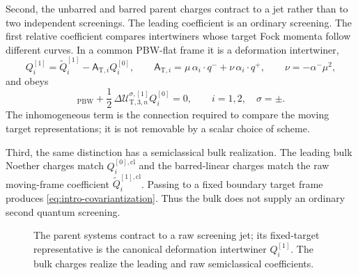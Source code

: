 \documentclass[11pt,a4paper]{article}
\numberwithin{equation}{section}
\theoremstyle{remark}
\newcommand{\PBW}{\mathrm{PBW}}
\newcommand{\cl}{\mathrm{cl}}
\newcommand{\T}{\mathrm{T}}
\newcommand{\cU}{\mathcal U}
\begin{document}
Second, the unbarred and barred parent charges contract to a jet rather than to two independent
screenings.  The leading coefficient is an ordinary screening.  The first relative coefficient
compares intertwiners whose target Fock momenta follow different curves.  In a common PBW-flat
frame it is a deformation intertwiner,
\begin{equation}
  Q_i^{[1]}=\widetilde Q_i^{[1]}-\mathsf A_{\T,i}Q_i^{[0]},
  \qquad
  \mathsf A_{\T,i}=\mu\,\alpha_i\!\cdot q^-+\nu\,\alpha_i\!\cdot q^+,
  \qquad \nu=-\alpha^-\mu^2,
  \label{eq:intro-covariantization}
\end{equation}
and obeys
\begin{equation}
 [Q_i^{[1]},\cU_{3,n}^{\sigma,[0]}]_{\PBW}
 +\frac12\,\Delta\cU_{\T,3,n}^{\sigma,[1]}Q_i^{[0]}=0,
 \qquad i=1,2,\quad \sigma=\pm.
 \label{eq:intro-main}
\end{equation}
The inhomogeneous term is the connection required to compare the moving target
representations; it is not removable by a scalar choice of scheme.

Third, the same distinction has a semiclassical bulk realization.  The leading bulk Noether
charges match $Q_i^{[0],\cl}$ and the barred-linear charges match the raw moving-frame
coefficient $\widetilde Q_i^{[1],\cl}$.  Passing to a fixed boundary target frame produces
\cref{eq:intro-covariantization}.  Thus the bulk does not supply an ordinary second quantum
screening.

\begin{figure}[t]
\centering
{}
\caption{The parent systems contract to a raw screening jet; its fixed-target representative
is the canonical deformation intertwiner $Q_i^{[1]}$.  The bulk charges realize the leading
and raw semiclassical coefficients.}
\label{fig:structure}
\end{figure}
\end{document}

